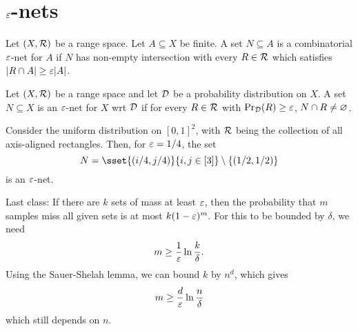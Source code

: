 \section{$\varepsilon$-nets} \label{sec:eps-nets}

\begin{definition}
    Let $(X, \mathcal{R})$ be a range space.
    Let $A \subseteq X$ be finite.
    A set $N \subseteq A$ is a combinatorial $\varepsilon$-net for $A$ if
    $N$ has non-empty intersection with every $R \in \mathcal{R}$ which satisfies
    $\lvert R \cap A\rvert \ge \varepsilon \lvert A\rvert$.
\end{definition}

\begin{definition}
    Let $(X, \mathcal{R})$ be a range space and let $\mathcal{D}$ be a probability
    distribution on $X$.
    A set $N \subseteq X$ is an $\varepsilon$-net for $X$ wrt $\mathcal{D}$ if
    for every $R \in \mathcal{R}$ with $\Pr_{\mathcal{D}}(R) \ge \varepsilon$,
    $N \cap R \ne \varnothing$.
\end{definition}
\begin{example}
    Consider the uniform distribution on $[0, 1]^2$, with $\mathcal{R}$ being the
    collection of all axis-aligned rectangles.
    Then, for $\varepsilon = 1/4$, the set \[
        N = \sset{(i/4, j/4)}{i, j \in [3]}
            \setminus \set{(1/2, 1/2)}
    \] is an $\varepsilon$-net.
\end{example}

Last class: If there are $k$ sets of mass at least $\varepsilon$,
then the probability that $m$ samples miss all given sets is at most
$k (1 - \varepsilon)^m$.
For this to be bounded by $\delta$, we need \[
    m \ge \frac1{\varepsilon} \ln \frac{k}{\delta}.
\] Using the Sauer-Shelah lemma, we can bound $k$ by $n^d$, which gives \[
    m \ge \frac{d}{\varepsilon} \ln \frac{n}{\delta}
\] which still depends on $n$.

